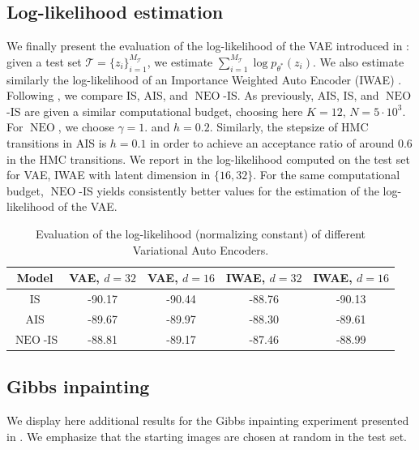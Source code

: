 \documentclass{article}
\def\IFIS{\ensuremath{\operatorname{NEO}}}
\def\InFiNE{{\small \IFIS}}
\def\NEO{{\small \IFIS}}
\newcommand{\1}{\mathds{1}}
\def\obs{z}
\begin{document}
\subsection{Log-likelihood estimation}
\label{subsec:log-likelihood-constant}
We finally present the evaluation of the log-likelihood of the VAE introduced in : given a test set $\mathcal{T} = \{\obs_i\}_{i=1}^{M_{\mathcal{T}}}$, we estimate $\sum_{i=1}^{M_{\mathcal{T}}}\log p_{\theta^*} (\obs_i)$. We also estimate similarly  the log-likelihood of an Importance Weighted Auto Encoder (IWAE) \cite{burda:grosse:2015}. 
Following \cite{wu:burda:grosse:2016}, we compare IS, AIS, and \NEO-IS. As previously, AIS, IS, and \NEO-IS are given a similar computational budget, choosing here $K=12$, $N= 5\cdot 10^3$. For \NEO, we choose $\gamma = 1.$ and $h=0.2$. Similarly, the stepsize of HMC transitions in AIS is $h=0.1$ in order to achieve an acceptance ratio of around $0.6$ in the HMC transitions. We report in  the log-likelihood computed on the test set for VAE, IWAE with latent dimension in $\{16, 32\}$. For the same computational budget, \IFIS-IS yields consistently better values for the estimation of the log-likelihood of the VAE.
\begin{table}[]
\centering
\begin{tabular}{ |c|c|c|c|c| }
\hline
Model & VAE, $d = 32$ & VAE, $d = 16$ & IWAE, $d = 32$ & IWAE, $d = 16$ \\
\hline
IS & -90.17 & -90.44 &  -88.76 &-90.13\\
\hline
AIS  & -89.67 & -89.97 &  -88.30 &-89.61 \\
\hline
\InFiNE-IS & -88.81  & -89.17 &-87.46 & -88.99 \\
\hline
\end{tabular}
\caption{Evaluation of the log-likelihood (normalizing constant) of different Variational Auto Encoders.}
\label{tab:ll_vae}
\end{table}
\subsection{Gibbs inpainting}
We display here additional results for the Gibbs inpainting experiment presented in . We emphasize that the starting images are chosen at random in the test set.
\end{document}
